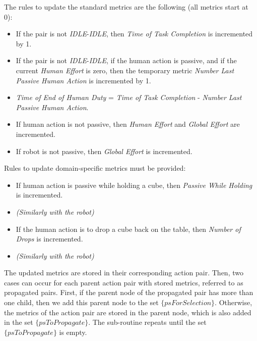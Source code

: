The rules to update the standard metrics are the following (all metrics start at 0):
\vspace{-\topsep}
\begin{itemize}
    \setlength\itemsep{-0.3em}
    \item If the pair is not \textit{IDLE}-\textit{IDLE}, then \textit{Time of Task Completion} is incremented by 1.
    \item If the pair is not \textit{IDLE}-\textit{IDLE}, if the human action is passive, and if the current \textit{Human Effort} is zero, then the temporary metric \textit{Number Last Passive Human Action} is incremented by 1.
    \item \textit{Time of End of Human Duty} = \textit{Time of Task Completion} - \textit{Number Last Passive Human Action}.
    \item If human action is not passive, then \textit{Human Effort} and \textit{Global Effort} are incremented.
    \item If robot is not passive, then \textit{Global Effort} is incremented.
\end{itemize}
Rules to update domain-specific metrics must be provided:
\vspace{-\topsep}
\begin{itemize}
    \setlength\itemsep{-0.3em}
    \item If human action is passive while holding a cube, then \textit{Passive While Holding} is incremented.
    \item \textit{(Similarly with the robot)}
    \item If the human action is to drop a cube back on the table, then \textit{Number of Drops} is incremented.
    \item \textit{(Similarly with the robot)}
\end{itemize}

The updated metrics are stored in their corresponding action pair. Then, two cases can occur for each parent action pair with stored metrics, referred to as propagated pairs. First, if the parent node of the propagated pair has more than one child, then we add this parent node to the set $\{psForSelection\}$. Otherwise, the metrics of the action pair are stored in the parent node, which is also added in the set $\{psToPropagate\}$. 
The sub-routine repeats until the set $\{psToPropagate\}$ is empty.

